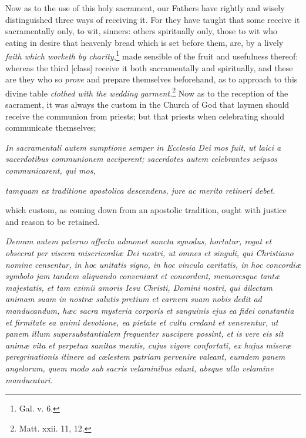 Now as to the use of this holy sacrament, our Fathers have rightly and wisely distinguished three ways of receiving it. For they have taught that some receive it sacramentally only, to wit, sinners: others spiritually only, those to wit who eating in desire that heavenly bread which is set before them, are, by a lively \emph{faith which worketh by charity},\footnote{\par   Gal. v. 6.} made sensible of the fruit and usefulness thereof: whereas the third [class] receive it both sacramentally and spiritually, and these are they who so \emph{ prove} and prepare themselves beforehand, as to approach to this divine table \emph{clothed with the wedding garment.}\footnote{\par   Matt. xxii. 11, 12.} Now as to the reception of the sacrament, it was always the custom in the Church of God that laymen should receive the communion from priests; but that priests when celebrating should communicate themselves;

\emph{In sacramentali autem sumptione semper in Ecclesia Dei mos fuit, ut laici a sacerdotibus communionem acciperent; sacerdotes autem celebrantes seipsos communicarent, qui mos, }

\emph{tamquam ex traditione apostolica descendens, jure ac merito retineri debet.}

which custom, as coming down from an apostolic tradition, ought with justice and reason to be retained.

\emph{Demum autem paterno affectu admonet sancta synodus, hortatur, rogat et obsecrat per viscera misericordiæ Dei nostri, ut omnes et singuli, qui Christiano nomine censentur, in hoc unitatis signo, in hoc vinculo caritatis, in hoc concordiæ symbolo jam tandem aliquando conveniant et concordent, memoresque tantæ majestatis, et tam eximii amoris Iesu Christi, Domini nostri, qui dilectam animam suam in nostræ salutis pretium et carnem suam nobis dedit ad manducandum, hæc sacra mysteria corporis et sanguinis ejus ea fidei constantia et firmitate ea animi devotione, ea pietate et cultu credant et venerentur, ut panem illum supersubstantialem frequenter suscipere possint, et is vere eis sit animæ vita et perpetua sanitas mentis, cujus vigore confortati, ex hujus miseræ peregrinationis itinere ad cœlestem patriam pervenire valeant, eumdem panem angelorum, quem modo sub sacris velaminibus edunt, absque ullo velamine manducaturi.}

